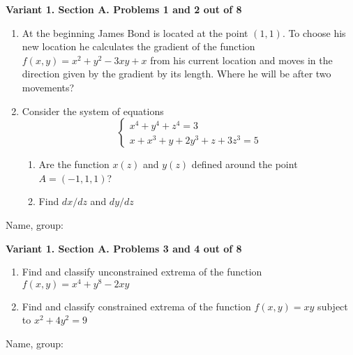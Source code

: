 \documentclass[12pt,a4paper]{article}
\begin{document}


\textbf{Variant 1. Section A. Problems 1 and 2 out of 8}

\begin{enumerate}

\item At the beginning James Bond is located at the point $(1, 1)$. To choose his new location he calculates the gradient of the function $f(x,y)=x^2+y^2 - 3xy+x$ from his current location and moves in the direction given by the gradient by its length. Where he will be after two movements?

\item Consider the system of equations
\[
\begin{cases}
x^4 + y^4 + z^4 = 3 \\
x + x^3 + y + 2y^3 + z + 3z^3 = 5
\end{cases}
\]

\begin{enumerate}
\item Are the function $x(z)$ and $y(z)$ defined around the point $A=(-1,1,1)$?
\item Find $dx/dz$ and $dy/dz$
\end{enumerate}

\end{enumerate}

\begin{framed}
\begin{minipage}{42em}
Name, group:\vspace*{3ex}\par 
\noindent\dotfill
\end{minipage}
\end{framed}


\newpage
\textbf{Variant 1. Section A. Problems 3 and 4 out of 8}


\begin{enumerate}[resume]


\item Find and classify unconstrained extrema of the function $f(x,y)=x^4 + y^8 - 2xy$

\item Find and classify constrained extrema of the function $f(x, y) =  xy$ subject to $x^2 + 4y^2= 9$

\end{enumerate}

\begin{framed}
\begin{minipage}{42em}
Name, group:\vspace*{3ex}\par 
\noindent\dotfill
\end{minipage}
\end{framed}
\end{document}
